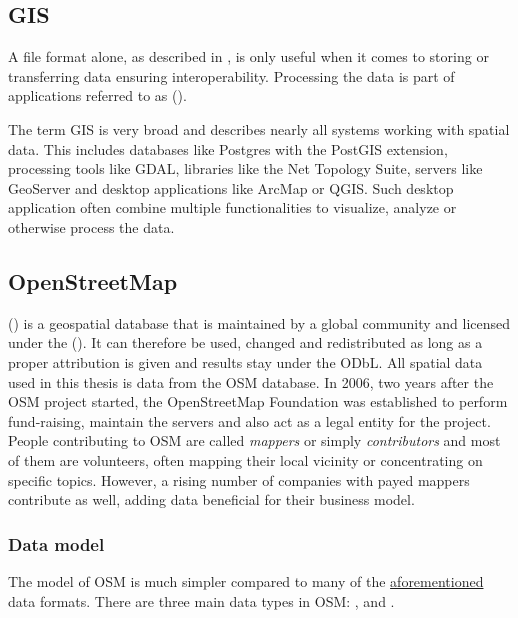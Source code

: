 	\subsection{GIS}
	
		A file format alone, as described in , is only useful when it comes to storing or transferring data ensuring interoperability.
		Processing the data is part of applications referred to as  ().
		
		The term GIS is very broad and describes nearly all systems working with spatial data.
		This includes databases like Postgres with the PostGIS extension, processing tools like GDAL, libraries like the Net Topology Suite, servers like GeoServer and desktop applications like ArcMap or QGIS.
		Such desktop application often combine multiple functionalities to visualize, analyze or otherwise process the data.
	
	\subsection{OpenStreetMap}
	\label{subsec:osm}
	
		 () is a geospatial database that is maintained by a global community and licensed under the  ()\cite{osm-wiki-about}.
		It can therefore be used, changed and redistributed as long as a proper attribution is given and results stay under the ODbL\cite{odbl-summary}.
		All spatial data used in this thesis is data from the OSM database.
		In 2006, two years after the OSM project started, the OpenStreetMap Foundation was established to perform fund-raising, maintain the servers and also act as a legal entity for the project.
		People contributing to OSM are called \textit{mappers} or simply \textit{contributors} and most of them are volunteers, often mapping their local vicinity or concentrating on specific topics.
		However, a rising number of companies with payed mappers contribute as well, adding data beneficial for their business model\cite{osm-corporate-mappers}.
		
		\subsubsection{Data model}
		
			The model of OSM is much simpler compared to many of the \hyperref[subsec:file-formats]{aforementioned} data formats.
			There are three main data types in OSM: ,  and \cite{osm-wiki-data-model}.
			
